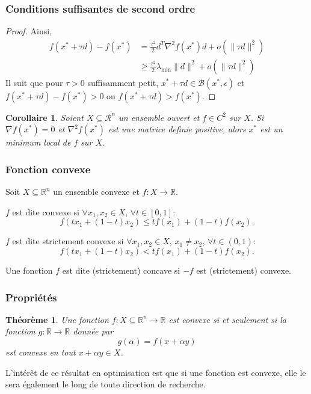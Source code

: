 \documentclass[usepdftitle=false]{beamer}
\newtheorem{thm}{Théorème}
\newtheorem{coro}{Corollaire}
\def\cB{\mathcal{B}}
\def\cR{\mathcal{R}}
\def\RR{\mathbb{R}}
\begin{document}
\begin{frame}
\frametitle{Conditions suffisantes de second ordre}

\begin{proof}
Ainsi,
\begin{align*}
f(x^* + \tau d) - f(x^*) &= \frac{\tau^2}{2} d^T \nabla^2 f(x^*) d + o(\| \tau d \|^2 ) \\
& \geq \frac{\tau^2}{2} \lambda_{\min} \|d\|^2 + o(\| \tau d \|^2 )
\end{align*}
Il suit que pour $\tau > 0$ suffisamment petit, $x^* + \tau d \in \cB(x^*, \epsilon)$ et $f(x^* + \tau d) - f(x^*) > 0$ ou $f(x^* + \tau d) > f(x^*)$.
\end{proof}

\begin{coro}
Soient $X \subseteq \cR^n$ un ensemble ouvert et $f \in C^2$ sur $X$.
Si $\nabla f(x^*) = 0$ et $\nabla^2 f(x^*)$ est une matrice definie positive, alors $x^*$ est un minimum local de $f$ sur $X$.
\end{coro}

\end{frame}

\begin{frame}
\frametitle{Fonction convexe}

Soit $X \subseteq \RR^n$ un ensemble convexe et $f: X \rightarrow \RR$.

\mbox{}

$f$ est dite {\color{red} convexe} si $\forall x_{1}, x_{2} \in X$, $\forall t \in [0,1]$:
$$f(tx_{1}+(1-t)x_{2})\leq tf(x_{1})+(1-t)f(x_{2}).$$

\mbox{}

$f$ est dite {\color{red} strictement convexe} si $\forall x_{1}, x_{2} \in X$, $x_1 \ne x_2$, $\forall t \in (0,1)$:
$$f(tx_{1}+(1-t)x_{2}) < tf(x_{1})+(1-t)f(x_{2}).$$

\mbox{}

Une fonction $f$ est dite {\color{red} (strictement) concave} si $-f$ est (strictement) convexe.

\end{frame}

\begin{frame}
\frametitle{Propriétés}

\begin{thm}
Une fonction $f: X \subseteq \RR^n \rightarrow \RR$ est convexe si et seulement si la fonction $g: \RR \rightarrow \RR$ donnée par
$$
g(\alpha) = f(x+\alpha y)
$$
est convexe en tout $x + \alpha y \in X$.
\end{thm}

\mbox{}

L'intérêt de ce résultat en optimisation est que si une fonction est convexe, elle le sera également le long de toute direction de recherche.

\end{frame}
\end{document}
